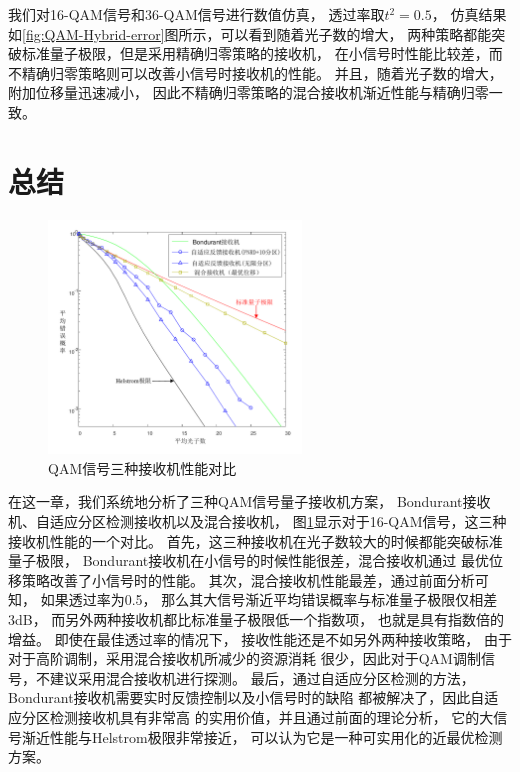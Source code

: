我们对16-QAM信号和36-QAM信号进行数值仿真，
透过率取$t^2=0.5$，
仿真结果如\ref{fig:QAM-Hybrid-error}图所示，可以看到随着光子数的增大，
两种策略都能突破标准量子极限，但是采用精确归零策略的接收机，
在小信号时性能比较差，而不精确归零策略则可以改善小信号时接收机的性能。
并且，随着光子数的增大，附加位移量迅速减小，
因此不精确归零策略的混合接收机渐近性能与精确归零一致。






\section{总结}

\begin{figure}
\centering
  \includegraphics[width=0.6\textwidth]{figures/chap3/QAM-error}
  \caption{QAM信号三种接收机性能对比}
  \label{fig:QAM-error}
\end{figure}

在这一章，我们系统地分析了三种QAM信号量子接收机方案，
Bondurant接收机、自适应分区检测接收机以及混合接收机，
图\ref{fig:QAM-error}显示对于16-QAM信号，这三种接收机性能的一个对比。
首先，这三种接收机在光子数较大的时候都能突破标准量子极限，
Bondurant接收机在小信号的时候性能很差，混合接收机通过
最优位移策略改善了小信号时的性能。
其次，混合接收机性能最差，通过前面分析可知，
如果透过率为0.5，
那么其大信号渐近平均错误概率与标准量子极限仅相差3dB，
而另外两种接收机都比标准量子极限低一个指数项，
也就是具有指数倍的增益。
即使在最佳透过率的情况下，
接收性能还是不如另外两种接收策略，
由于对于高阶调制，采用混合接收机所减少的资源消耗
很少，因此对于QAM调制信号，不建议采用混合接收机进行探测。
最后，通过自适应分区检测的方法，
Bondurant接收机需要实时反馈控制以及小信号时的缺陷
都被解决了，因此自适应分区检测接收机具有非常高
的实用价值，并且通过前面的理论分析，
它的大信号渐近性能与Helstrom极限非常接近，
可以认为它是一种可实用化的近最优检测方案。





